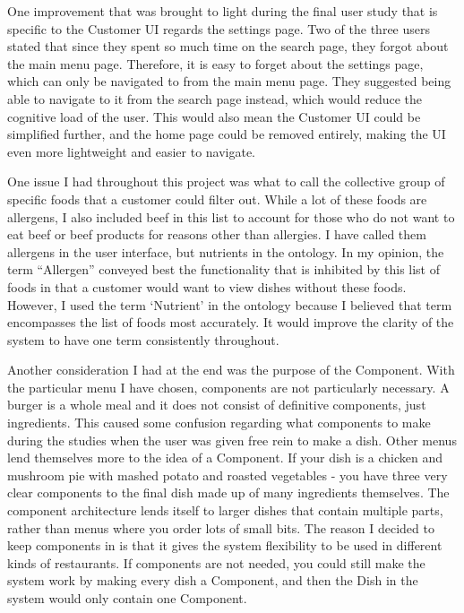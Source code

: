 One improvement that was brought to light during the final user study that is specific to the Customer UI regards the settings page. Two of the three users stated that since they spent so much time on the search page, they forgot about the main menu page. Therefore, it is easy to forget about the settings page, which can only be navigated to from the main menu page. They suggested being able to navigate to it from the search page instead, which would reduce the cognitive load of the user. This would also mean the Customer UI could be simplified further, and the home page could be removed entirely, making the UI even more lightweight and easier to navigate.

One issue I had throughout this project was what to call the collective group of specific foods that a customer could filter out. While a lot of these foods are allergens, I also included beef in this list to account for those who do not want to eat beef or beef products for reasons other than allergies. I have called them allergens in the user interface, but nutrients in the ontology. In my opinion, the term ``Allergen'' conveyed best the functionality that is inhibited by this list of foods in that a customer would want to view dishes without these foods. However, I used the term `Nutrient' in the ontology because I believed that term encompasses the list of foods most accurately. It would improve the clarity of the system to have one term consistently throughout. 

Another consideration I had at the end was the purpose of the Component. With the particular menu I have chosen, components are not particularly necessary. A burger is a whole meal and it does not consist of definitive components, just ingredients. This caused some confusion regarding what components to make during the studies when the user was given free rein to make a dish. Other menus lend themselves more to the idea of a Component. If your dish is a chicken and mushroom pie with mashed potato and roasted vegetables - you have three very clear components to the final dish made up of many ingredients themselves. The component architecture lends itself to larger dishes that contain multiple parts, rather than menus where you order lots of small bits. The reason I decided to keep components in is that it gives the system flexibility to be used in different kinds of restaurants. If components are not needed, you could still make the system work by making every dish a Component, and then the Dish in the system would only contain one Component.



